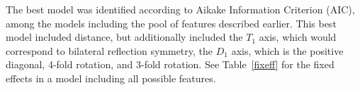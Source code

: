 
The best model was identified according to Aikake Information Criterion (AIC), among the models including the pool of features described earlier. This best model included distance, but additionally included the $T_1$ axis, which would correspond to bilateral reflection symmetry, the $D_1$ axis, which is the positive diagonal, 4-fold rotation, and 3-fold rotation. See Table~\ref{fixeff} for the fixed effects in a model including all possible features.